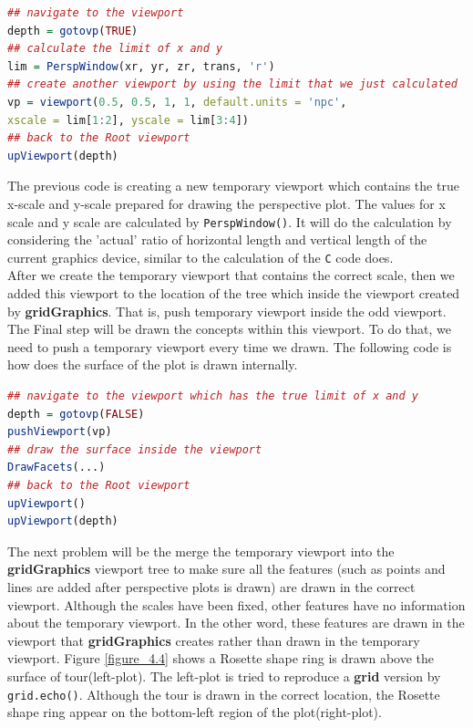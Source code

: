 \documentclass{report}
\begin{document}
\newpage
\begin{lstlisting}[language = R]
## navigate to the viewport
depth = gotovp(TRUE) 
## calculate the limit of x and y
lim = PerspWindow(xr, yr, zr, trans, 'r')  
## create another viewport by using the limit that we just calculated
vp = viewport(0.5, 0.5, 1, 1, default.units = 'npc',
xscale = lim[1:2], yscale = lim[3:4]) 
## back to the Root viewport
upViewport(depth)  
\end{lstlisting}
The previous code is creating a new temporary viewport which contains the true x-scale and y-scale prepared for drawing the perspective plot. The values for x scale and y scale are calculated by \texttt{PerspWindow()}. It will do the calculation by considering the 'actual' ratio of horizontal length and vertical length of the current graphics device, similar to the calculation of the \texttt{C} code does.\\
After we create the temporary viewport that contains the correct scale, then we added this viewport to the location of the tree which inside the viewport created by \textbf{gridGraphics}. That is, push temporary viewport inside the odd viewport. The Final step will be drawn the concepts within this viewport. To do that, we need to push a temporary viewport every time we drawn. The following code is how does the surface of the plot is drawn internally.
\begin{lstlisting}[language = R]
## navigate to the viewport which has the true limit of x and y
depth = gotovp(FALSE)
pushViewport(vp)
## draw the surface inside the viewport
DrawFacets(...)
## back to the Root viewport
upViewport()
upViewport(depth)
\end{lstlisting}

The next problem will be the merge the temporary viewport into the \textbf{gridGraphics} viewport tree to make sure all the features (such as points and lines are added after perspective plots is drawn) are drawn in the correct viewport. Although the scales have been fixed, other features have no information about the temporary viewport. In the other word, these features are drawn in the viewport that \textbf{gridGraphics} creates rather than drawn in the temporary viewport. Figure \ref{figure_4.4} shows a Rosette shape ring is drawn above the surface of tour(left-plot). The left-plot is tried to reproduce a \textbf{grid} version by \texttt{grid.echo()}. Although the tour is drawn in the correct location, the Rosette shape ring appear on the bottom-left region of the plot(right-plot).
\end{document}

